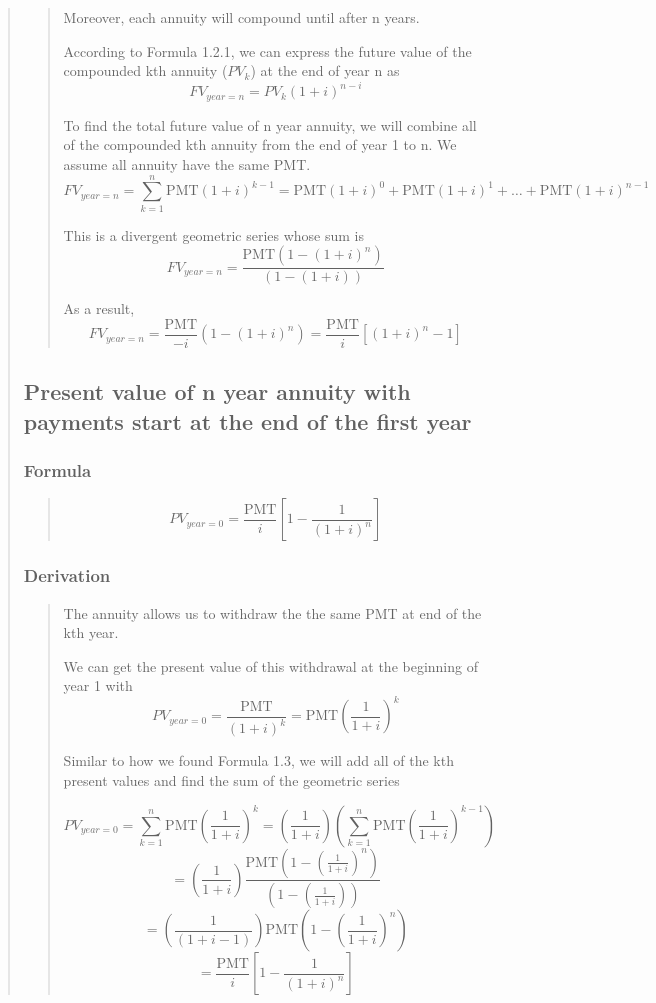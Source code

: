 \documentclass{article} %
\begin{document}
\begin{quote}
\begin{quote}
        Moreover, each annuity will compound until after n years.

        According to Formula 1.2.1, we can express the future value of the compounded kth annuity ($PV_k$) at the end of year n as
        \[
            FV_{year = n} = PV_k (1 + i)^{n - i}
        \]

        To find the total future value of n year annuity, we will combine all of the compounded kth annuity from the end of year 1 to n.
        We assume all annuity have the same PMT.
        \[
            FV_{year = n} = \sum_{k = 1}^{n} \text{PMT} (1 + i)^{k - 1} = \text{PMT} (1 + i)^{0} + \text{PMT} (1 + i)^{1} + \ldots + \text{PMT} (1 + i)^{n - 1}
        \]

        This is a divergent geometric series whose sum is
        \[
            FV_{year = n} = \frac{\text{PMT}(1 - (1 + i)^n)}{(1 - (1 + i))}
        \]

        As a result,
        \[
            FV_{year = n} = \frac{\text{PMT}}{-i}(1 - (1 + i)^n) = \boxed{\frac{\text{PMT}}{i}\left[(1 + i)^n - 1\right]}
        \]
    \end{quote}


    \subsection{Present value of n year annuity with payments start at the end of the first year}
    \subsubsection{Formula}
    \begin{quote}
        \[
            PV_{year = 0} = \frac{\text{PMT}}{i}\left[1 - \frac{1}{(1 + i)^n}\right]
        \]
    \end{quote}
    \subsubsection{Derivation}
    \begin{quote}
        The annuity allows us to withdraw the the same PMT at end of the kth year.

        We can get the present value of this withdrawal at the beginning of year 1 with
        \[
            PV_{year=0} = \frac{\text{PMT}}{(1 + i)^{k}} = \text{PMT}\left(\frac{1}{1 + i}\right)^k
        \]

        Similar to how we found Formula 1.3, we will add all of the kth present values and find the sum of the geometric series


        \[  PV_{year=0} = \sum_{k = 1}^{n} \text{PMT}\left(\frac{1}{1 + i}\right)^k = \left(\frac{1}{1 + i}\right)\left(\sum_{k = 1}^{n} \text{PMT}\left(\frac{1}{1 + i}\right)^{k - 1}\right) \]
        \[= \left(\frac{1}{1 + i}\right) \frac{\text{PMT}(1 - (\frac{1}{1 + i})^n)}{(1 - (\frac{1}{1 + i}))}\]
        \[= \left(\frac{1}{\left(1 + i - 1\right)}\right)\text{PMT}\left(1 - \left(\frac{1}{1 + i}\right)^n\right)\]
        \[= \boxed{\frac{\text{PMT}}{i}\left[1 - \frac{1}{(1 + i)^n}\right]}\]




    \end{quote}
\end{quote}
\end{document}
